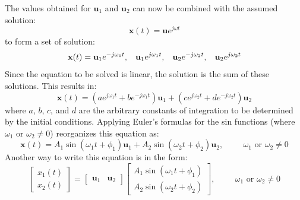\documentclass[12pt,letter]{article}
\numberwithin{ex}{section} %
\numberwithin{re}{section} %
\begin{document}
The values obtained for $\mathbf{u}_1$ and $\mathbf{u}_2$ can now be combined with the assumed solution:
\begin{equation}
	\mathbf{x}(t) = \mathbf{u}e^{j\omega t}
\end{equation}
to form a set of solution:
\begin{equation}
	\mathbf{x}(t) = \mathbf{u}_1e^{-j\omega_1 t}, \hspace{2ex} \mathbf{u}_1e^{j\omega_1 t}, \hspace{2ex} \mathbf{u}_2e^{-j\omega_2 t}, \hspace{2ex} \mathbf{u}_2e^{j\omega_2 t}
\end{equation}
Since the equation to be solved is linear, the solution is the sum of these solutions. This results in:
\begin{equation}
	\mathbf{x}(t) = (a e^{j\omega_1 t} + b e^{-j\omega_1 t})\mathbf{u}_1 +(c e^{j\omega_2 t} + d e^{-j\omega_2 t})\mathbf{u}_2
\end{equation}
where $a$, $b$, $c$, and $d$ are the arbitrary constants of integration to be determined by the initial conditions. Applying Euler's formulas for the sin functions (where $\omega_1 \text{ or } \omega_2 \neq 0$) reorganizes this equation as:
\begin{equation}
	\mathbf{x}(t) = A_1 \sin (\omega_1 t + \phi_1 )\mathbf{u}_1 + A_2 \sin (\omega_2 t + \phi_2 )\mathbf{u}_2 , \hspace{1cm} \omega_1 \text{ or } \omega_2 \neq 0
\end{equation}
Another way to write this equation is in the form:
\begin{equation}
	 \begin{bmatrix} x_1(t) \\  x_2(t) \end{bmatrix} =  \begin{bmatrix} \mathbf{u}_1 & \mathbf{u}_2 \end{bmatrix}
	 \begin{bmatrix} A_1 \sin (\omega_1 t + \phi_1 )\\ A_2 \sin (\omega_2 t + \phi_2 )\end{bmatrix}, \hspace{1cm} \omega_1 \text{ or } \omega_2 \neq 0
\end{equation}
\end{document}
